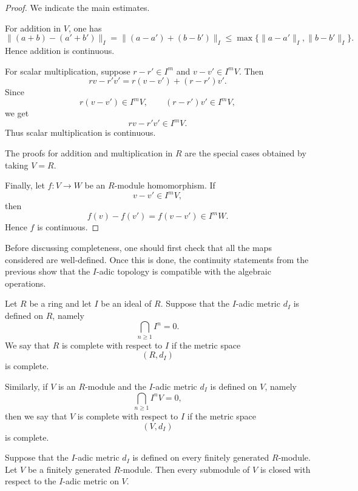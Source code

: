 \begin{proof}
    We indicate the main estimates.

    For addition in \(V\), one has
    \[
        \|(a+b)-(a'+b')\|_I
        =
        \|(a-a')+(b-b')\|_I
        \leq
        \max\{\|a-a'\|_I,\|b-b'\|_I\}.
    \]
    Hence addition is continuous.

    For scalar multiplication, suppose \(r-r'\in I^m\) and \(v-v'\in I^mV\).
    Then
    \[
        rv-r'v'
        =
        r(v-v')+(r-r')v'.
    \]
    Since
    \[
        r(v-v')\in I^mV,
        \qquad
        (r-r')v'\in I^mV,
    \]
    we get
    \[
        rv-r'v'\in I^mV.
    \]
    Thus scalar multiplication is continuous.

    The proofs for addition and multiplication in \(R\) are the special cases obtained
    by taking \(V=R\).

    Finally, let \(f:V\to W\) be an \(R\)-module homomorphism. If
    \[
        v-v'\in I^mV,
    \]
    then
    \[
        f(v)-f(v')=f(v-v')\in I^mW.
    \]
    Hence \(f\) is continuous.
\end{proof}

Before discussing completeness, one should first check that all the maps considered
are well-defined. Once this is done, the continuity statements from the previous 
show that the \(I\)-adic topology is compatible with the algebraic operations.

\begin{definition}
    Let \(R\) be a ring and let \(I\) be an ideal of \(R\). Suppose that the
    \(I\)-adic metric \(d_I\) is defined on \(R\), namely
    \[
        \bigcap_{n\geq 1} I^n = 0.
    \]
    We say that \(R\) is complete with respect to \(I\) if the metric space
    \[
        (R,d_I)
    \]
    is complete.

    Similarly, if \(V\) is an \(R\)-module and the \(I\)-adic metric \(d_I\) is
    defined on \(V\), namely
    \[
        \bigcap_{n\geq 1} I^nV=0,
    \]
    then we say that \(V\) is complete with respect to \(I\) if the metric space
    \[
        (V,d_I)
    \]
    is complete.
\end{definition}

\begin{theorem}
    Suppose that the \(I\)-adic metric \(d_I\) is defined on every finitely generated
    \(R\)-module. Let \(V\) be a finitely generated \(R\)-module. Then every submodule
    of \(V\) is closed with respect to the \(I\)-adic metric on \(V\).
\end{theorem}

